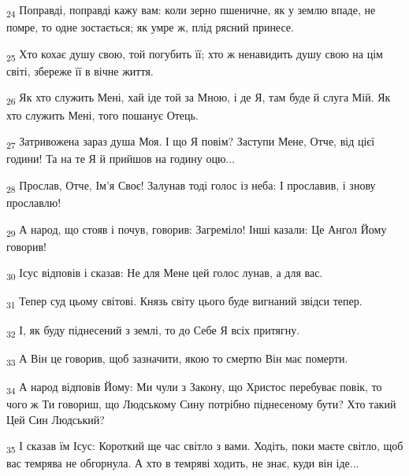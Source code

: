 \begin{tcolorbox}
\textsubscript{24} Поправді, поправді кажу вам: коли зерно пшеничне, як у землю впаде, не помре, то одне зостається; як умре ж, плід рясний принесе.
\end{tcolorbox}
\begin{tcolorbox}
\textsubscript{25} Хто кохає душу свою, той погубить її; хто ж ненавидить душу свою на цім світі, збереже її в вічне життя.
\end{tcolorbox}
\begin{tcolorbox}
\textsubscript{26} Як хто служить Мені, хай іде той за Мною, і де Я, там буде й слуга Мій. Як хто служить Мені, того пошанує Отець.
\end{tcolorbox}
\begin{tcolorbox}
\textsubscript{27} Затривожена зараз душа Моя. І що Я повім? Заступи Мене, Отче, від цієї години! Та на те Я й прийшов на годину оцю...
\end{tcolorbox}
\begin{tcolorbox}
\textsubscript{28} Прослав, Отче, Ім'я Своє! Залунав тоді голос із неба: І прославив, і знову прославлю!
\end{tcolorbox}
\begin{tcolorbox}
\textsubscript{29} А народ, що стояв і почув, говорив: Загреміло! Інші казали: Це Ангол Йому говорив!
\end{tcolorbox}
\begin{tcolorbox}
\textsubscript{30} Ісус відповів і сказав: Не для Мене цей голос лунав, а для вас.
\end{tcolorbox}
\begin{tcolorbox}
\textsubscript{31} Тепер суд цьому світові. Князь світу цього буде вигнаний звідси тепер.
\end{tcolorbox}
\begin{tcolorbox}
\textsubscript{32} І, як буду піднесений з землі, то до Себе Я всіх притягну.
\end{tcolorbox}
\begin{tcolorbox}
\textsubscript{33} А Він це говорив, щоб зазначити, якою то смертю Він має померти.
\end{tcolorbox}
\begin{tcolorbox}
\textsubscript{34} А народ відповів Йому: Ми чули з Закону, що Христос перебуває повік, то чого ж Ти говориш, що Людському Сину потрібно піднесеному бути? Хто такий Цей Син Людський?
\end{tcolorbox}
\begin{tcolorbox}
\textsubscript{35} І сказав їм Ісус: Короткий ще час світло з вами. Ходіть, поки маєте світло, щоб вас темрява не обгорнула. А хто в темряві ходить, не знає, куди він іде...
\end{tcolorbox}
